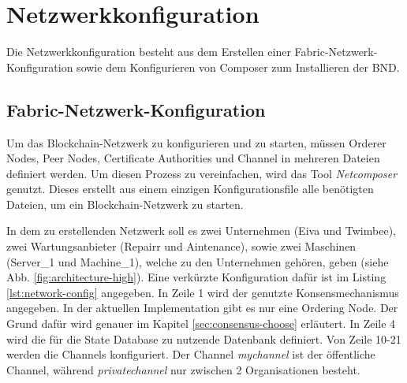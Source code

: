 
\section{Netzwerkkonfiguration}
\label{sec:network-config}
Die Netzwerkkonfiguration besteht aus dem Erstellen einer Fabric-Netzwerk-Konfiguration sowie dem Konfigurieren von Composer zum Installieren der \acs{BND}. 

\subsection{Fabric-Netzwerk-Konfiguration}
Um das Blockchain-Netzwerk zu konfigurieren und zu starten, müssen Orderer Nodes, Peer Nodes, Certificate Authorities und Channel in mehreren Dateien definiert werden. Um diesen Prozess zu vereinfachen, wird das Tool \textit{Netcomposer}\cite{IBMSilvergateTeamnetcomposerGithubRepository2018} genutzt. Dieses erstellt aus einem einzigen Konfigurationsfile alle benötigten Dateien, um ein Blockchain-Netzwerk zu starten. 

In dem zu erstellenden Netzwerk soll es zwei Unternehmen (Eiva und Twimbee), zwei Wartungsanbieter (Repairr und Aintenance), sowie zwei Maschinen (Server\_1 und Machine\_1), welche zu den Unternehmen gehören, geben (siehe Abb. \ref{fig:architecture-high}). Eine verkürzte Konfiguration dafür ist im Listing \ref{lst:network-config} angegeben. In Zeile 1 wird der genutzte Konsensmechanismus angegeben. In der aktuellen Implementation gibt es nur eine Ordering Node. Der Grund dafür wird genauer im Kapitel \ref{sec:consensus-choose} erläutert. In Zeile 4 wird die für die State Database zu nutzende Datenbank definiert. Von Zeile 10-21 werden die Channels konfiguriert. Der Channel \textit{mychannel} ist der öffentliche Channel, während \textit{privatechannel} nur zwischen 2 Organisationen besteht. 

